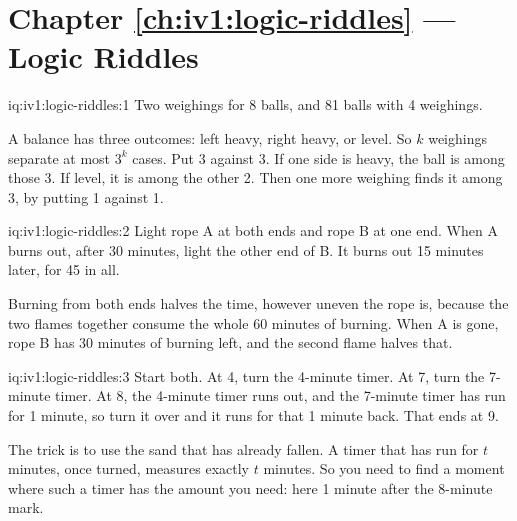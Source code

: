 \section*{Chapter \ref{ch:iv1:logic-riddles} --- Logic Riddles}

\begin{solution}{iq:iv1:logic-riddles:1}
Two weighings for 8 balls, and 81 balls with 4 weighings.

A balance has three outcomes: left heavy, right heavy, or level. So $k$ weighings separate at most $3^k$ cases. Put 3 against 3. If one side is heavy, the ball is among those 3. If level, it is among the other 2. Then one more weighing finds it among 3, by putting 1 against 1.

\end{solution}

\begin{solution}{iq:iv1:logic-riddles:2}
Light rope A at both ends and rope B at one end. When A burns out, after 30 minutes, light the other end of B. It burns out 15 minutes later, for 45 in all.

Burning from both ends halves the time, however uneven the rope is, because the two flames together consume the whole 60 minutes of burning. When A is gone, rope B has 30 minutes of burning left, and the second flame halves that.

\end{solution}

\begin{solution}{iq:iv1:logic-riddles:3}
Start both. At 4, turn the 4-minute timer. At 7, turn the 7-minute timer. At 8, the 4-minute timer runs out, and the 7-minute timer has run for 1 minute, so turn it over and it runs for that 1 minute back. That ends at 9.

The trick is to use the sand that has already fallen. A timer that has run for $t$ minutes, once turned, measures exactly $t$ minutes. So you need to find a moment where such a timer has the amount you need: here 1 minute after the 8-minute mark.

\end{solution}

